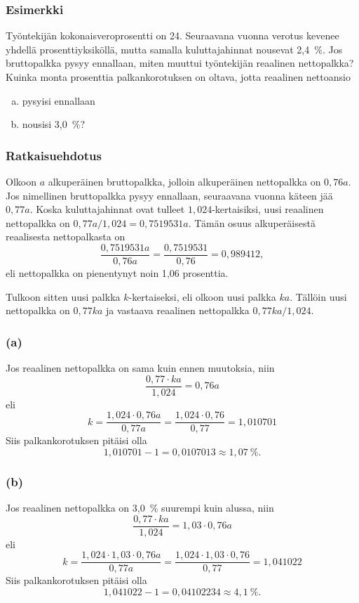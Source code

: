 \documentclass[]{beamer}\usepackage[]{graphicx}\usepackage[]{color}
\theoremstyle{remark}
\begin{document}
	\begin{frame}
		\frametitle{Esimerkki}
			Työntekijän kokonaisveroprosentti on 24. Seuraavana vuonna verotus kevenee yhdellä prosenttiyksiköllä, mutta samalla kuluttajahinnat nousevat 2,4~\%. Jos bruttopalkka pysyy ennallaan, miten muuttui työntekijän reaalinen nettopalkka? Kuinka monta prosenttia 
			palkankorotuksen on oltava, jotta reaalinen nettoansio 
			\begin{enumerate}[(a)]
				\item pysyisi ennallaan
				\item nousisi 3,0~\%?
			\end{enumerate}
		\end{frame}

		\begin{frame}
			\frametitle{Ratkaisuehdotus}
			Olkoon \(a\) alkuperäinen bruttopalkka, jolloin alkuperäinen nettopalkka on \(0,76a\). \pause Jos nimellinen bruttopalkka pysyy ennallaan, seuraavana vuonna käteen jää \(0,77a\). \pause Koska kuluttajahinnat ovat tulleet \(1,024\)-kertaisiksi, uusi reaalinen nettopalkka on \(0,77a/1,024 = 0{,}7519531a\). \pause Tämän osuus alkuperäisestä reaalisesta nettopalkasta on
			\[
				\frac{0{,}7519531a}{0,76a} = \frac{0{,}7519531}{0,76} = 0{,}989412,
			\]
			\pause eli nettopalkka on pienentynyt noin 1{,}06 prosenttia.
		\end{frame}

		\begin{frame}
			Tulkoon sitten uusi palkka \(k\)-kertaiseksi, eli olkoon uusi palkka \(ka\). \pause Tällöin uusi nettopalkka on \(0,77ka\) ja vastaava reaalinen nettopalkka \(0,77ka/1,024\).
		\end{frame}

		\begin{frame}
			\frametitle{(a)}
			\pause
			Jos  reaalinen nettopalkka on sama kuin ennen muutoksia, niin
			\[
				\frac{0,77\cdot ka}{1,024} = 0,76a
			\]
			\pause eli
			\[
				k = \frac{1,024 \cdot 0,76a}{0,77a} = \frac{1,024\cdot0,76}{0,77} = 1{,}010701
			\]
			\pause Siis palkankorotuksen pitäisi olla 
			\[
				1{,}010701 - 1 = 0{,}0107013 \approx 1{,}07~\%.
			\]
		\end{frame}

		\begin{frame}
			\frametitle{(b)}
			\pause
			Jos reaalinen nettopalkka on 3,0~\% suurempi kuin alussa, niin
			\[
				\frac{0,77\cdot ka}{1,024} = 1,03\cdot0,76a
			\]
			\pause eli
			\[
				k = \frac{1,024 \cdot 1,03\cdot 0,76a}{0,77a} = \frac{1,024\cdot1,03\cdot 0,76}{0,77} = 1{,}041022
			\]
			\pause Siis palkankorotuksen pitäisi olla 
			\[
				1{,}041022 - 1 = 0{,}04102234 \approx 4{,}1~\%.
			\]
		\end{frame}
\end{document}
